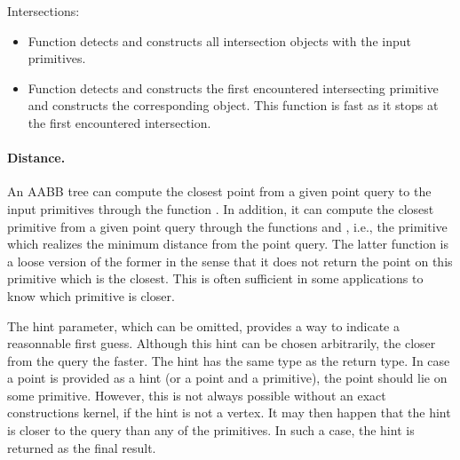 Intersections:
\begin{itemize}
\item Function  detects and constructs all intersection objects with the input primitives.
\item Function  detects and constructs the first encountered intersecting primitive and constructs the corresponding object. This function is fast as it stops at the first encountered intersection.
\end{itemize}

\paragraph{Distance.} An AABB tree can compute the closest point from a given point query to the input primitives through the function . In addition, it can compute the closest primitive from a given point query through the functions  and , i.e., the primitive which realizes the minimum distance from the point query. The latter function is a loose version of the former in the sense that it does not return the point on this primitive which is the closest. This is often sufficient in some applications to know which primitive is closer. 

The hint parameter, which can be omitted, provides a way to indicate a reasonnable first guess. Although this hint can be chosen arbitrarily, the closer from the query the faster. The hint has the same type as the return type. In case a point is provided as a hint (or a point and a primitive), the point should lie on some primitive. However, this is not always possible without an exact constructions kernel, if the hint is not a vertex. It may then happen that the hint is closer to the query than any of the primitives. In such a case, the hint is returned as the final result. 
